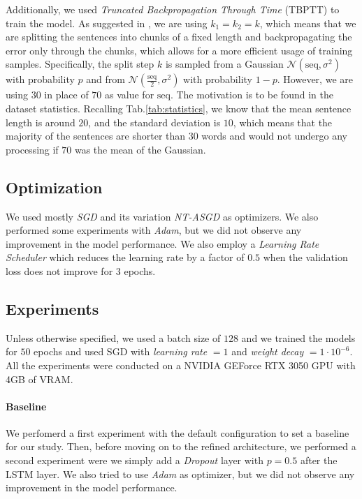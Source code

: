 Additionally, we used \emph{Truncated Backpropagation Through Time} (TBPTT) to train the model. As suggested in \cite{merity2017regularizing}, we are using $k_1 = k_2 = k$, which means that we are splitting the sentences into chunks of a fixed length and backpropagating the error only through the chunks, which allows for a more efficient usage of training samples. Specifically, the split step $k$ is sampled from a Gaussian $\mathcal{N}(\textrm{seq}, \sigma^2)$ with probability $p$ and from $\mathcal{N}(\frac{\textrm{seq}}{2}, \sigma^2)$ with probability $1-p$. However, we are using $30$ in place of $70$ as value for $\textrm{seq}$. The motivation is to be found in the dataset statistics. Recalling Tab.\ref{tab:statistics}, we know that the mean sentence length is around $20$, and the standard deviation is $10$, which means that the majority of the sentences are shorter than $30$ words and would not undergo any processing if $70$ was the mean of the Gaussian.

\subsection{Optimization}
We used mostly \emph{SGD} and its variation \emph{NT-ASGD}\cite{merity2017regularizing} as optimizers. We also performed some experiments with \emph{Adam}, but we did not observe any improvement in the model performance. We also employ a \emph{Learning Rate Scheduler} which reduces the learning rate by a factor of $0.5$ when the validation loss does not improve for $3$ epochs.

\subsection{Experiments}
Unless otherwise specified, we used a batch size of $128$ and we trained the models for $50$ epochs and used SGD with \emph{learning rate} $= 1$ and \emph{weight decay} $=1\cdot 10^{-6}$. All the experiments were conducted on a NVIDIA GEForce RTX 3050 GPU with 4GB of VRAM.
\paragraph*{Baseline} 
We perfomerd a first experiment with the default configuration to set a baseline for our study. Then, before moving on to the refined architecture, we performed a second experiment were we simply add a \emph{Dropout} layer with $p=0.5$ after the LSTM layer. We also tried to use \emph{Adam} as optimizer, but we did not observe any improvement in the model performance.
